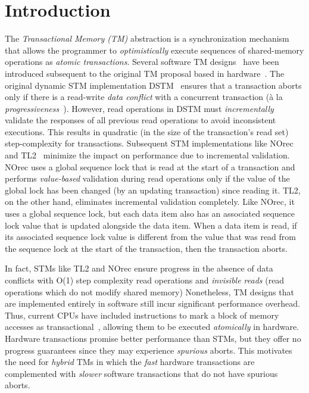 \section{Introduction}
\label{sec:intro}
%
%
The \emph{Transactional Memory (TM)} abstraction is a synchronization mechanism 
that allows the programmer to \emph{optimistically} execute sequences of shared-memory
operations as \emph{atomic transactions}.
Several software TM designs~\cite{norec, ST95,HLM+03, astm, fraser} have been introduced subsequent to the original TM proposal based in
hardware~\cite{HM93}. 
The original dynamic STM implementation DSTM~\cite{HLM+03} ensures that a transaction aborts only if there is a read-write \emph{data conflict} with a concurrent
transaction (\`a la \emph{progressiveness}~\cite{tm-book}). However, read operations in DSTM must \emph{incrementally} validate
the responses of all previous read operations to avoid inconsistent executions. 
This results in quadratic  (in the size of the transaction's read
set) step-complexity for transactions. Subsequent STM 
implementations like NOrec~\cite{norec} and TL2~\cite{DSS06}
minimize the impact on performance due to incremental validation.
NOrec uses a global sequence lock that is read at the start of a transaction and performs \emph{value-based}
validation during read operations only if the value of the global lock has been changed (by an updating transaction) 
since reading it.
TL2, on the other hand, eliminates incremental validation completely.
Like NOrec, it uses a global sequence lock, but each data item also 
has an associated sequence lock value that is updated alongside the data item.
When a data item is read, if its associated sequence lock value is different 
from the value that was read from the sequence lock at the start of the transaction, then the transaction aborts.

In fact, STMs like TL2 and NOrec ensure progress in the absence of data conflicts with 
O(1) step complexity read operations and \emph{invisible reads} (read operations which 
do not modify shared memory) 
Nonetheless, TM designs that are implemented entirely in software still incur significant performance overhead.
Thus, current CPUs have included instructions to mark a block of memory accesses as transactional~\cite{Rei12, asf, bluegene}, allowing them to be executed \emph{atomically} in hardware.
Hardware transactions promise better performance than STMs, but they offer no progress guarantees 
since they may experience \emph{spurious} aborts. This motivates the need for
\emph{hybrid} TMs in which the \emph{fast} hardware transactions are 
complemented with \emph{slower} software transactions that do not have spurious aborts.

